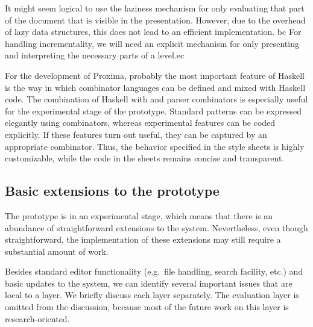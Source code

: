 \bc
It might seem logical to use the laziness mechanism for only evaluating that part of the document that is visible in the presentation. However, due to the overhead of lazy data structures, this does not lead to an efficient implementation. bc For handling incrementality, we will need an explicit mechanism for only presenting and interpreting the necessary parts of a level.ec 
\ec

For the development of Proxima, probably the most important feature of Haskell is the way in which combinator languages can be defined and mixed with Haskell code. The combination of Haskell with {\Xprez}  and parser combinators is especially useful for the experimental stage of the prototype. Standard patterns can be expressed elegantly using combinators, whereas experimental features can be coded explicitly. If these features turn out useful, they can be captured by an appropriate combinator. Thus, the behavior specified in the style sheets is highly customizable, while the code in the sheets remains concise and transparent.


\subsection{Basic extensions to the prototype}

The prototype is in an experimental stage, which means that there is an abundance of straightforward extensions to the system. Nevertheless, even though  straightforward, the implementation of these extensions may still require a substantial amount of work. 

Besides standard editor functionality (e.g.\  file handling, search facility, etc.) and basic updates to the system, we can identify several important issues that are local to a layer. We briefly discuss each layer separately. The evaluation layer is omitted from the discussion, because most of the future work on this layer is research-oriented.

%
%


